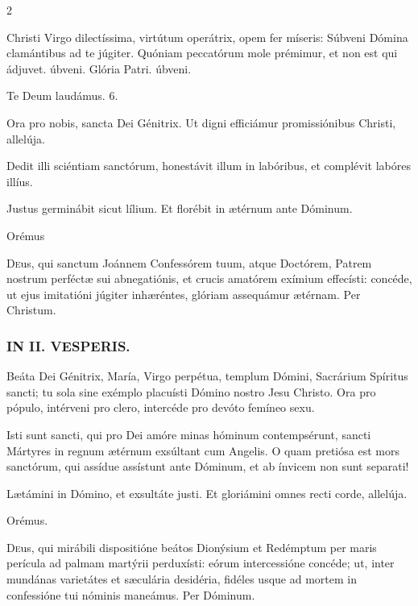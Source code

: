 \documentclass[9pt,twoside]{extarticle}
\begin{document}
\begin{multicols}{2}
\begin{tightlist}{}
\item {} Christi Virgo dilectíssima, virtútum operátrix, opem fer míseris: \textred{*} Súbveni Dómina clamántibus ad te júgiter.  Quóniam peccatórum mole prémimur, et non est qui ádjuvet. úbveni. Glória Patri. úbveni.
\item Te Deum laudámus. 6.
\item {} Ora pro nobis, sancta Dei Génitrix.  Ut digni efficiámur promissiónibus Christi, allelúja.
\item {} Dedit illi sciéntiam sanctórum, honestávit illum in labóribus, et complévit labóres illíus.
\item {} Justus germinábit sicut lílium.  Et florébit in ætérnum ante Dóminum.
\item Orémus \hfill {}
\end{tightlist}
\lettrine{D}eus, qui sanctum Joánnem Confessórem tuum, atque Doctórem, Patrem nostrum perféctæ sui abnegatiónis, et crucis amatórem exímium effecísti: concéde, ut ejus imitatióni júgiter inhæréntes, glóriam assequámur ætérnam. Per Christum.

\begin{tightlist}{}
\item {}
\end{tightlist}

\subsubsection*{\center \textsc{IN II. VESPERIS.}}
\begin{tightlist}{}
\item {} Beáta Dei Génitrix, María, Virgo perpétua, templum Dómini, Sacrárium Spíritus sancti; tu sola sine exémplo placuísti Dómino nostro Jesu Christo. Ora pro pópulo, intérveni pro clero, intercéde pro devóto femíneo sexu.
\item {} Isti sunt sancti, qui pro Dei amóre minas hóminum contempsérunt, sancti Mártyres in regnum ætérnum exsúltant cum Angelis. O quam pretiósa est mors sanctórum, qui assídue assístunt ante Dóminum, et ab ínvicem non sunt separati!
\item {} Lætámini in Dómino, et exsultáte justi.  Et gloriámini omnes recti corde, allelúja.
\item Orémus. \hfill {}
\end{tightlist}
\lettrine{D}eus, qui mirábili dispositióne beátos Dionýsium et Redémptum per maris perícula ad palmam martýrii perduxísti: eórum intercessióne concéde; ut, inter mundánas varietátes et sæculária desidéria, fidéles usque ad mortem in confessióne tui nóminis maneámus. Per Dóminum.


\end{multicols}
\end{document}
